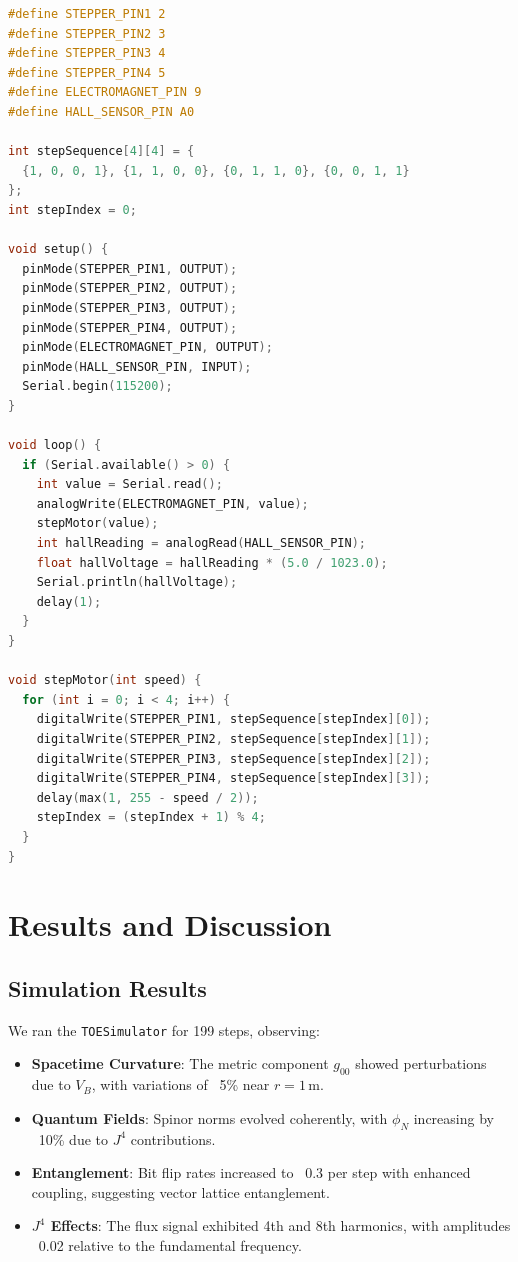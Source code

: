 \documentclass[12pt]{article}
\begin{document}
\begin{lstlisting}[language=C]
#define STEPPER_PIN1 2
#define STEPPER_PIN2 3
#define STEPPER_PIN3 4
#define STEPPER_PIN4 5
#define ELECTROMAGNET_PIN 9
#define HALL_SENSOR_PIN A0

int stepSequence[4][4] = {
  {1, 0, 0, 1}, {1, 1, 0, 0}, {0, 1, 1, 0}, {0, 0, 1, 1}
};
int stepIndex = 0;

void setup() {
  pinMode(STEPPER_PIN1, OUTPUT);
  pinMode(STEPPER_PIN2, OUTPUT);
  pinMode(STEPPER_PIN3, OUTPUT);
  pinMode(STEPPER_PIN4, OUTPUT);
  pinMode(ELECTROMAGNET_PIN, OUTPUT);
  pinMode(HALL_SENSOR_PIN, INPUT);
  Serial.begin(115200);
}

void loop() {
  if (Serial.available() > 0) {
    int value = Serial.read();
    analogWrite(ELECTROMAGNET_PIN, value);
    stepMotor(value);
    int hallReading = analogRead(HALL_SENSOR_PIN);
    float hallVoltage = hallReading * (5.0 / 1023.0);
    Serial.println(hallVoltage);
    delay(1);
  }
}

void stepMotor(int speed) {
  for (int i = 0; i < 4; i++) {
    digitalWrite(STEPPER_PIN1, stepSequence[stepIndex][0]);
    digitalWrite(STEPPER_PIN2, stepSequence[stepIndex][1]);
    digitalWrite(STEPPER_PIN3, stepSequence[stepIndex][2]);
    digitalWrite(STEPPER_PIN4, stepSequence[stepIndex][3]);
    delay(max(1, 255 - speed / 2));
    stepIndex = (stepIndex + 1) % 4;
  }
}
\end{lstlisting}

\section{Results and Discussion}
\label{sec:results}

\subsection{Simulation Results}

We ran the \texttt{TOESimulator} for 199 steps, observing:

\begin{itemize}
    \item \textbf{Spacetime Curvature}: The metric component \( g_{00} \) showed perturbations due to \( V_B \), with variations of ~5\% near \( r = 1 \, \text{m} \).
    \item \textbf{Quantum Fields}: Spinor norms evolved coherently, with \( \phi_N \) increasing by ~10\% due to \( J^4 \) contributions.
    \item \textbf{Entanglement}: Bit flip rates increased to ~0.3 per step with enhanced coupling, suggesting vector lattice entanglement.
    \item \textbf{\( J^4 \) Effects}: The flux signal exhibited 4th and 8th harmonics, with amplitudes ~0.02 relative to the fundamental frequency.
\end{itemize}
\end{document}
